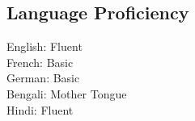\documentclass[margin, 10pt]{res} %
\begin{document}
\begin{resume}


\section{Language Proficiency}
English: Fluent\\
French: Basic\\
German: Basic\\
Bengali: Mother Tongue\\
Hindi: Fluent

\end{resume}
\end{document}
